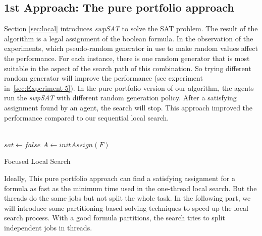 \documentclass[12pt,a4paper,twoside]{scrartcl}
\numberwithin{equation}{section}
\begin{document}
\subsection{1st Approach: The pure portfolio approach}
Section \ref{sec:local} introduces \emph{swpSAT} to solve the SAT problem.
The result of the algorithm is a legal assignment of the boolean formula. In the observation of the experiments, which pseudo-random generator in use to make random values affect the performance. For each instance, there is one random generator that is most suitable in the aspect of the search path of this combination. So trying different random generator will improve the performance  (see experiment in~\ref{sec:Experiment 5}). In the pure portfolio version of our algorithm, the agents run the \emph{swpSAT} with different random generation policy. After a satisfying assignment found by an agent, the search will stop. This approach improved the performance compared to our sequential local search.\\ 
\\
\begin{algorithm}[H]
  $sat \leftarrow false$\;
    $A \leftarrow initAssign(F)$
 \caption{Focused Local Search}
\end{algorithm}  
Ideally, This pure portfolio approach can find a satisfying assignment for a formula as fast as the minimum time used in the one-thread local search. But the threads do the same jobs but not split the whole task. 
In the following part, we will introduce some partitioning-based solving techniques to speed up the local search process. With a good formula partitions, the search tries to split independent jobs in threads. 
\end{document}
